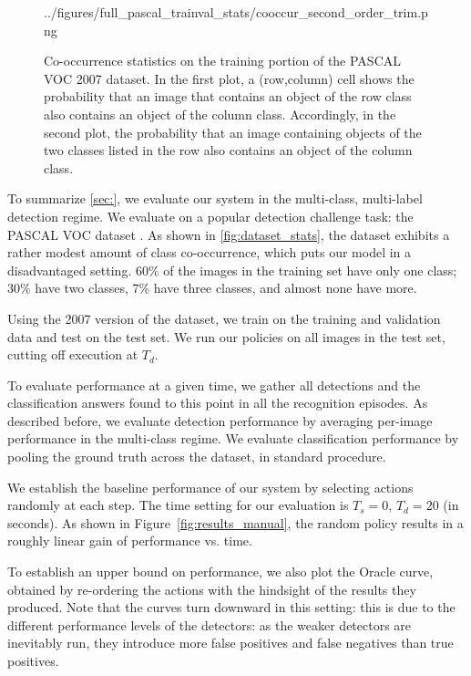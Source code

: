 \begin{figure}[h!]
{    {../figures/full_pascal_trainval_stats/cooccur_second_order_trim.png}}
  \caption{
  Co-occurrence statistics on the training portion of the PASCAL VOC 2007 dataset.
  In the first plot, a (row,column) cell shows the probability that an image that contains an object of the row class also contains an object of the column class.
  Accordingly, in the second plot, the probability that an image containing objects of the two classes listed in the row also contains an object of the column class.
  }
  \label{fig:dataset_stats}
\end{figure}

To summarize \autoref{sec:}, we evaluate our system in the multi-class, multi-label detection regime.
We evaluate on a popular detection challenge task: the PASCAL VOC dataset \cite{pascal-voc-2010}.
As shown in \autoref{fig:dataset_stats}, the dataset exhibits a rather modest amount of class co-occurrence, which puts our model in a disadvantaged setting.
$60\%$ of the images in the training set have only one class; $30\%$ have two classes, $7\%$ have three classes, and almost none have more.

Using the 2007 version of the dataset, we train on the training and validation data and test on the test set.
We run our policies on all images in the test set, cutting off execution at $T_d$.

To evaluate performance at a given time, we gather all detections and the classification answers found to this point in all the recognition episodes.
As described before, we evaluate detection performance by averaging per-image performance in the multi-class regime.
We evaluate classification performance by pooling the ground truth across the dataset, in standard procedure.

We establish the baseline performance of our system by selecting actions randomly at each step.
The time setting for our evaluation is $T_s=0$, $T_d=20$ (in seconds).
As shown in Figure~\ref{fig:results_manual}, the random policy results in a roughly linear gain of performance vs. time.

To establish an upper bound on performance, we also plot the Oracle curve, obtained by re-ordering the actions with the hindsight of the results they produced.
Note that the curves turn downward in this setting: this is due to the different performance levels of the detectors: as the weaker detectors are inevitably run, they introduce more false positives and false negatives than true positives.



